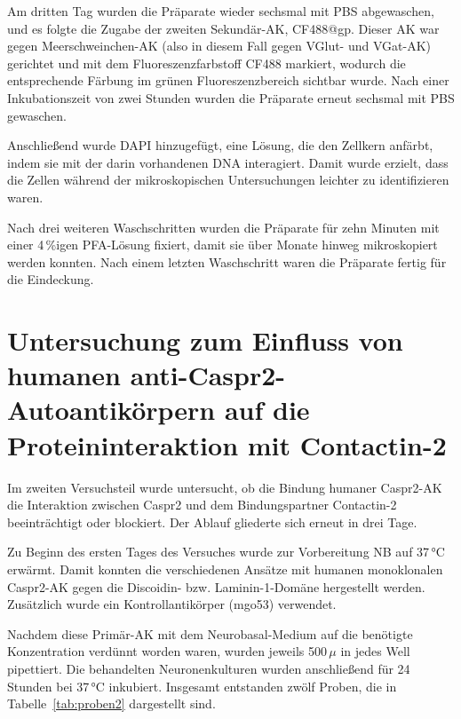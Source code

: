 Am dritten Tag wurden die Präparate wieder sechsmal mit PBS abgewaschen, und
es folgte die Zugabe der zweiten Sekundär-AK, CF488@gp. Dieser AK war gegen Meerschweinchen-AK (also in diesem Fall gegen VGlut- und
VGat-AK) gerichtet und mit dem Fluoreszenzfarbstoff CF488 markiert, wodurch die entsprechende Färbung im grünen Fluoreszenzbereich sichtbar wurde. Nach einer Inkubationszeit von zwei Stunden wurden die Präparate erneut sechsmal mit PBS gewaschen.

Anschließend wurde DAPI hinzugefügt, eine Lösung, die den Zellkern
anfärbt, indem sie mit der darin vorhandenen DNA interagiert. Damit wurde erzielt, dass die Zellen während der mikroskopischen Untersuchungen leichter zu identifizieren waren.

Nach drei weiteren Waschschritten wurden die Präparate für zehn Minuten mit einer 4\,\%igen PFA-Lösung fixiert, damit sie über Monate hinweg mikroskopiert werden konnten. Nach einem letzten Waschschritt waren die Präparate fertig für die Eindeckung.

\section{Untersuchung zum Einfluss von humanen anti-Caspr2-Autoantikörpern auf die Proteininteraktion mit Contactin-2}

Im zweiten Versuchsteil wurde untersucht, ob die Bindung humaner Caspr2-AK die Interaktion zwischen Caspr2 und dem Bindungspartner Contactin-2 beeinträchtigt oder blockiert. Der Ablauf gliederte sich erneut in drei Tage.

Zu Beginn des ersten Tages des Versuches wurde zur Vorbereitung NB auf 37\,°C erwärmt. Damit konnten die verschiedenen Ansätze mit humanen monoklonalen Caspr2-AK gegen die Discoidin- bzw. Laminin-1-Domäne hergestellt werden. Zusätzlich wurde ein Kontrollantikörper (mgo53) verwendet.

Nachdem diese Primär-AK mit dem Neurobasal-Medium auf die benötigte Konzentration verdünnt worden waren, wurden jeweils 500\,$\mu$ in jedes Well pipettiert. Die behandelten Neuronenkulturen wurden anschließend für 24 Stunden bei 37\,°C inkubiert. Insgesamt entstanden zwölf Proben, die in Tabelle~\ref{tab:proben2} dargestellt sind.


